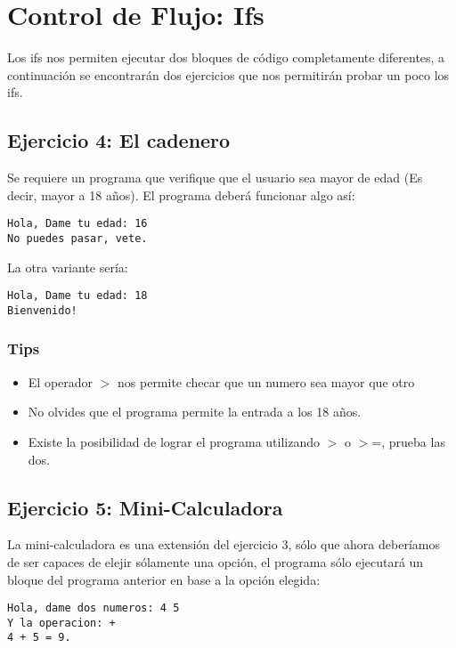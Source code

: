 \documentclass{article}
\begin{document}
\section{Control de Flujo: Ifs}
Los ifs nos permiten ejecutar dos bloques de c\'odigo completamente diferentes, a continuaci\'on se encontrar\'an dos ejercicios que nos permitir\'an probar un poco los ifs.
\subsection{Ejercicio 4: El cadenero}
Se requiere un programa que verifique que el usuario sea mayor de edad (Es decir, mayor a 18 a\~nos). El programa deber\'a funcionar algo as\'i:
\begin{lstlisting}[style=DOS]
Hola, Dame tu edad: 16
No puedes pasar, vete.
\end{lstlisting}
La otra variante ser\'ia:
\begin{lstlisting}[style=DOS]
Hola, Dame tu edad: 18
Bienvenido!
\end{lstlisting}
\subsubsection{Tips}
\begin{itemize}
  \item El operador $>$ nos permite checar que un numero sea mayor que otro
  \item No olvides que el programa permite la entrada a los 18 a\~nos.
  \item Existe la posibilidad de lograr el programa utilizando $>$ o $>$=, prueba las dos.
\end{itemize}

\subsection{Ejercicio 5: Mini-Calculadora}
La mini-calculadora es una extensi\'on del ejercicio 3, s\'olo que ahora deber\'iamos de ser capaces de elejir s\'olamente una opci\'on, el programa s\'olo ejecutar\'a un bloque del programa anterior en base a la opci\'on elegida:

\begin{lstlisting}[style=DOS]
Hola, dame dos numeros: 4 5
Y la operacion: +
4 + 5 = 9.
\end{lstlisting}
\end{document}
